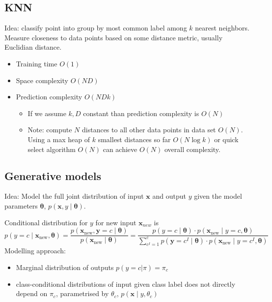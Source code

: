 \documentclass[11pt, %
	oneside, %
	english, %
	onehalfspacing, %
	parskip, %
	]{article} %
\theoremstyle{definition}
\begin{document}
\subsection{KNN}

Idea: classify point into group by most common label among $k$ nearest neighbors. Measure closeness to data points based on some distance metric, usually Euclidian distance.

\begin{itemize}
	\item Training time $O(1)$
	\item Space complexity $O(ND)$
	\item Prediction complexity $O(NDk)$
	\begin{itemize}
		\item If we assume $k, D$ constant than prediction complexity is $O(N)$
		\item Note: compute $N$ distances to all other data points in data set $O(N)$. Using a max heap of $k$ smallest distances so far $O(N \log k)$ or quick select algorithm $O(N)$ can achieve $O(N)$ overall complexity.
	\end{itemize}
\end{itemize}

\subsection{Generative models}

Idea: Model the full joint distribution of input $\mathbf{x}$ and output $y$ given the model parameters $\boldsymbol{\theta}$, $p(\mathbf{x}, y \mid \boldsymbol{\theta})$.

Conditional distribution for $y$ for new input $\mathbf{x}_{new}$ is
\begin{equation*}
	p\left(y=c \mid \mathbf{x}_{\mathrm{new}}, \boldsymbol{\theta}\right)=\frac{p\left(\mathbf{x}_{\mathrm{new}}, \boldsymbol{y}=c \mid \boldsymbol{\theta}\right)}{p\left(\mathbf{x}_{\mathrm{new}} \mid \boldsymbol{\theta}\right)}=\frac{p(y=c \mid \boldsymbol{\theta}) \cdot p\left(\mathbf{x}_{\mathrm{new}} \mid y=c, \boldsymbol{\theta}\right)}{\sum_{c^{I}=1}^c p\left(\boldsymbol{y}=c^{I} \mid \boldsymbol{\theta}\right) \cdot p\left(\mathbf{x}_{\mathrm{new}} \mid y=c^{I}, \boldsymbol{\theta}\right)}
\end{equation*}
Modelling approach:
\begin{itemize}
	\item Marginal distribution of outputs $p(y = c | \pi) = \pi_c$
	\item class-conditional distributions of input given class label does not directly depend on $\pi_c$, parametrised by $\theta_c$, $p(\mathbf{x} \mid y, \theta_c)$
\end{itemize}
\end{document}
